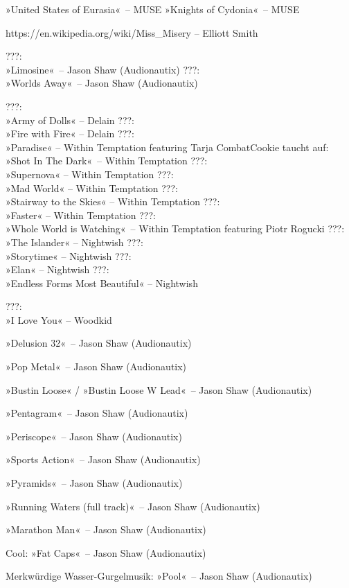     »United States of Eurasia«~– MUSE
    »Knights of Cydonia«~– MUSE

    https://en.wikipedia.org/wiki/Miss_Misery – Elliott Smith

    ???:\\ »Limosine«~– Jason Shaw (Audionautix)
    ???:\\ »Worlds Away«~– Jason Shaw (Audionautix)


    ???:\\ »Army of Dolls« – Delain
    ???:\\ »Fire with Fire« – Delain
    ???:\\ »Paradise« – Within Temptation featuring Tarja
    CombatCookie taucht auf:\\ »Shot In The Dark«~– Within Temptation
    ???:\\ »Supernova« – Within Temptation
    ???:\\ »Mad World« – Within Temptation
    ???:\\ »Stairway to the Skies« – Within Temptation
    ???:\\ »Faster« – Within Temptation
    ???:\\ »Whole World is Watching«~– Within Temptation featuring Piotr Rogucki
    ???:\\ »The Islander« – Nightwish
    ???:\\ »Storytime« – Nightwish
    ???:\\ »Elan« – Nightwish
    ???:\\ »Endless Forms Most Beautiful« – Nightwish

    ???:\\ »I Love You« – Woodkid

    \item »Delusion 32«~– Jason Shaw (Audionautix)
    \item »Pop Metal«~– Jason Shaw (Audionautix)
    \item »Bustin Loose« / »Bustin Loose W Lead«~– Jason Shaw (Audionautix)
    \item »Pentagram«~– Jason Shaw (Audionautix)
    \item »Periscope«~– Jason Shaw (Audionautix)
    \item »Sports Action«~– Jason Shaw (Audionautix)
    \item »Pyramids«~– Jason Shaw (Audionautix)
    \item »Running Waters (full track)«~– Jason Shaw (Audionautix)
    \item »Marathon Man«~– Jason Shaw (Audionautix)
    \item Cool: »Fat Caps«~– Jason Shaw (Audionautix)
    \item Merkwürdige Wasser-Gurgelmusik: »Pool«~– Jason Shaw (Audionautix)

